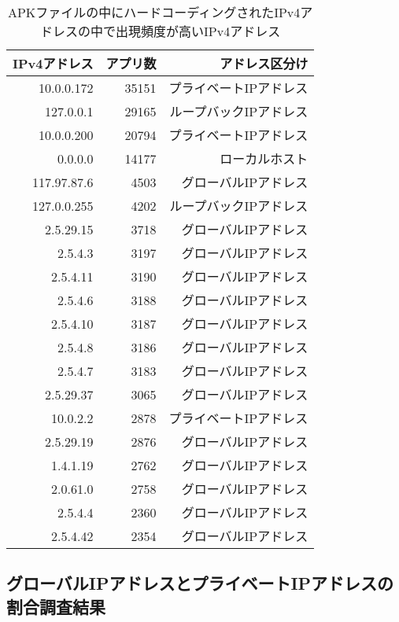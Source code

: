 \documentclass[a4j]{jarticle}
\begin{document}
\begin{table}[htb]
  \begin{center}
    \caption{APKファイルの中にハードコーディングされたIPv4アドレスの中で出現頻度が高いIPv4アドレス}
    \begin{tabular}{|r|r|r|} \hline
      IPv4アドレス & アプリ数 & アドレス区分け\\ \hline \hline
10.0.0.172 & 35151 &プライベートIPアドレス\\ \hline
127.0.0.1 & 29165& ループバックIPアドレス\\ \hline
10.0.0.200 & 20794 & プライベートIPアドレス\\ \hline
0.0.0.0 & 14177 &　ローカルホスト\\ \hline
117.97.87.6 & 4503 & グローバルIPアドレス\\ \hline
127.0.0.255 & 4202 & ループバックIPアドレス\\ \hline
2.5.29.15 & 3718 & グローバルIPアドレス\\ \hline
2.5.4.3 & 3197 & グローバルIPアドレス\\ \hline
2.5.4.11 & 3190&　グローバルIPアドレス \\ \hline
2.5.4.6 & 3188 & グローバルIPアドレス\\ \hline
2.5.4.10 & 3187 & グローバルIPアドレス\\ \hline
2.5.4.8 & 3186 & グローバルIPアドレス\\ \hline
2.5.4.7 & 3183 & グローバルIPアドレス\\ \hline
2.5.29.37 & 3065 & グローバルIPアドレス\\ \hline
10.0.2.2 & 2878 & プライベートIPアドレス\\ \hline
2.5.29.19 & 2876& グローバルIPアドレス \\ \hline
1.4.1.19 & 2762 & グローバルIPアドレス\\ \hline
2.0.61.0 & 2758 & グローバルIPアドレス\\ \hline
2.5.4.4 & 2360 & グローバルIPアドレス\\ \hline
2.5.4.42 & 2354 & グローバルIPアドレス\\ \hline
    \end{tabular}
    \label{tab:price}
  \end{center}
\end{table}

\newpage

\subsection{グローバルIPアドレスとプライベートIPアドレスの割合調査結果}
\end{document}
